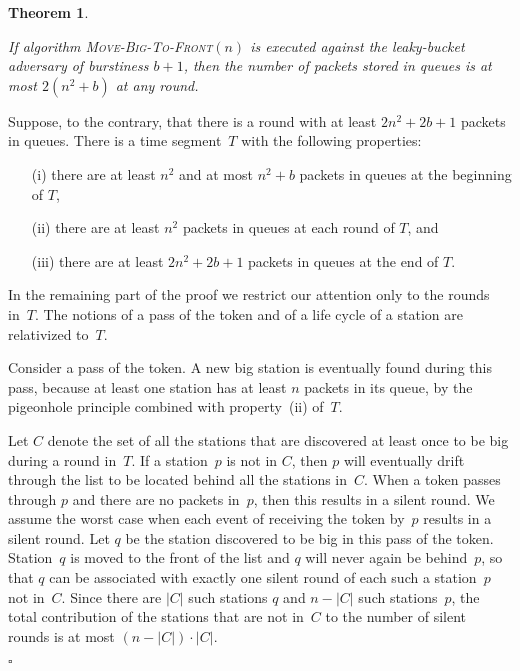 \documentclass[11pt]{article}
\newcommand{\qed}{\hfill $\square$ \smallbreak}
\newenvironment{proof}{\noindent{\bf Proof:}}{\qed}
\newtheorem{theorem}{Theorem}
\begin{document}

\begin{theorem}
\label{thm:move-big-to-front-stable}

If algorithm \textsc{Move-Big-To-Front}$(n)$ is executed against the leaky-bucket adversary of burstiness $b+1$, then the number of packets stored in queues is at most $2(n^2 + b)$ at any round.
\end{theorem}

\begin{proof}
Suppose, to the contrary, that there is a round with at least $2n^2+2b+1$ packets in queues.
There is a time segment~$T$ with the following properties:
\begin{enumerate}
\item[(i)] there are at least $n^2$ and at most $n^2+b$ packets in queues at the beginning of $T$,
\item[(ii)]  there are at least $n^2$ packets in queues at each round of $T$, and
\item[(iii)] there are at least $2n^2+2b+1$ packets in queues at the end of $T$.
\end{enumerate}
In the remaining part of the proof we restrict our attention only to the rounds in~$T$.
The notions of a pass of the token and of a life cycle of a station are relativized to~$T$.

Consider a pass of the token.
A new big station is eventually found during this pass, because at least one station has at least  $n$ packets in its queue, by the pigeonhole principle combined with property~(ii) of~$T$.

Let $C$ denote the set of all the stations that are discovered at least once to be big during a round in~$T$.
If a station~$p$ is not in $C$, then $p$ will eventually drift through the list to be located behind all the stations in~$C$.
When a token passes through $p$ and there are no packets in~$p$, then this results in a silent round.
We assume the worst case when each event of receiving the token by~$p$ results in a silent round.
Let $q$ be the station discovered to be big in this pass of the token.
Station~$q$ is moved to the front of the list and $q$ will never again be behind~$p$, so that $q$ can be associated with exactly one silent round of each such a station~$p$ not in~$C$.
Since there are $|C|$ such stations $q$ and $n-|C|$ such stations~$p$, the total contribution of the stations that are not in~$C$ to the number of silent rounds is at most $(n-|C|)\cdot |C|$.


\end{proof}
\end{document}
